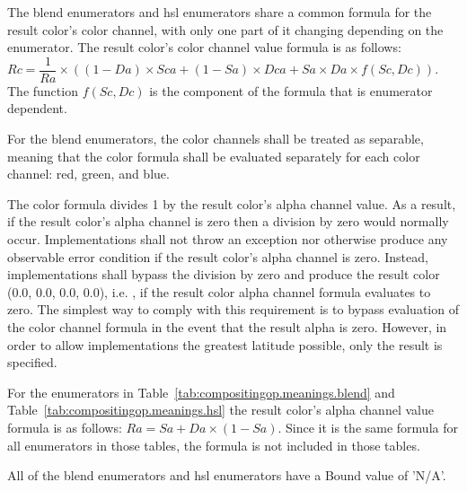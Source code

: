 \pnum
The blend enumerators and hsl enumerators share a common formula for the result 
color's color channel, with only one part of it changing depending on the 
enumerator. The result color's color channel value formula is as follows: $Rc = 
\dfrac{1}{Ra} \times ((1 - Da) \times Sca + (1 - Sa) \times Dca + Sa \times Da 
\times f(Sc, Dc))$. The function $f(Sc, Dc)$ is the component of the formula 
that is enumerator dependent.

\pnum
For the blend enumerators, the color channels shall be treated as separable, 
meaning that the color formula shall be evaluated separately for each color 
channel: red, green, and blue.

\pnum
The color formula divides 1 by the result color's alpha channel value. As a 
result, if the result color's alpha channel is zero then a division by zero 
would normally occur. Implementations shall not throw an exception nor  
otherwise produce any observable error condition if the result color's alpha 
channel is zero. Instead, implementations shall bypass the division by zero and 
produce the result color (0.0, 0.0, 0.0, 0.0), i.e. , if the result color alpha channel formula 
evaluates to zero.
\enternote
The simplest way to comply with this requirement is to bypass evaluation of the 
color channel formula in the event that the result alpha is zero. However, in 
order to allow implementations the greatest latitude possible, only the result 
is specified.
\exitnote

\pnum
For the enumerators in 
Table~\ref{tab:compositingop.meanings.blend} and 
Table~\ref{tab:compositingop.meanings.hsl} the result color's 
alpha channel value formula is as follows: $Ra = Sa + Da \times (1 - Sa)$.
\enternote
Since it is the same formula for all enumerators in those tables, the formula 
is not included in those tables.
\exitnote

\pnum
All of the blend enumerators and hsl enumerators have a Bound value of 'N/A'.

